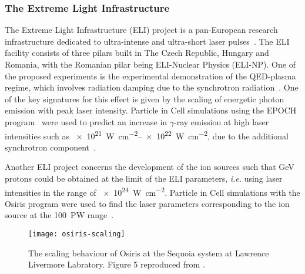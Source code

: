 \documentclass[12pt, class=report, crop=false]{standalone}
\begin{document}
\subsubsection{The Extreme Light Infrastructure}

The Extreme Light Infrastructure (ELI) project is a pan-European research
infrastructure dedicated to ultra-intense and ultra-short laser
pulses~\autocite{gales_introduction_2016}. The ELI facility consists of three
pilars built in The Czech Republic, Hungary and Romania, with the Romanian
pilar being ELI-Nuclear Physics (ELI-NP). One of the proposed experiments is the
experimental demonstration of the QED-plasma regime, which involves radiation
damping due to the synchrotron radiation~\autocite{turcu_highfield_2016}.
One of the key signatures for this effect is given by the scaling of energetic
photon emission with peak laser intensity. Particle in Cell simulations
using the EPOCH program~\autocite{arber_contemporaryparticleincell_2015} were used
to predict an increase in \(\gamma\)-ray emission at high laser intensities such as
\SIrange[range-phrase=--,range-units=single]{e21}{e22}{\watt\per\square\centi\metre},
due to the additional synchrotron component~\autocite{brady_synchrotronradiation_2014}.

Another ELI project concerns the development of the ion sources such that GeV
protons could be obtained at the limit of the ELI parameters, \emph{i.e.} using
laser intensities in the range of \SI{e24}{\watt\per\square\centi\metre}.
Particle in Cell simulations with the Osiris program were used to find the laser
parameters corresponding to the ion source at the \SI{100}{\peta\watt}
range~\autocite[327]{mourou_eliextreme_2011}.

\begin{figure}[h]
  \texttt{[image: osiris-scaling]}
  \caption{The scaling behaviour of Osiris at the Sequoia system at Lawrence Livermore Labratory.
  Figure 5 reproduced from \textcite{fonseca_exploitingmultiscale_2013}.}%
  \label{fig:osiris-scaling}%
\end{figure}
\end{document}
